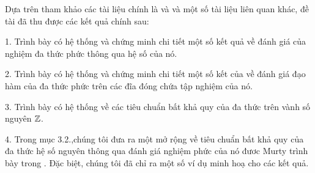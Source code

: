 \documentclass[a5paper,12pt]{report}
\theoremstyle{definition}
\numberwithin{equation}{chapter}
\begin{document}
	Dựa trên tham khảo các tài liệu chính là \cite{B} và \cite{R} và một số tài liệu liên quan khác, đề tài đã thu được các kết quả chính sau:
	\par 1. Trình bày có hệ thống và chứng minh chi tiết  một số kết quả về đánh giá của nghiệm đa thức phức thông qua hệ số của nó.
	\par 2. Trình bày có hệ thống và chứng minh chi tiết một số kết của về đánh giá đạo hàm của đa thức phức trên các đĩa đóng chứa tập nghiệm của nó. 
	\par 3. Trình bày có hệ thống về các tiêu chuẩn bất khả quy của đa thức trên vành số nguyên $\Bbb Z$.
	\par 4. Trong mục 3.2.,chúng  tôi đưa ra một mở rộng về  tiêu chuẩn bất khả quy của đa thức hệ số nguyên thông qua đánh giá nghiệm phức của nó đươc Murty trình bày trong \cite{R}. Đặc biệt, chúng tôi đã  chỉ ra một số ví dụ minh hoạ cho các kết quả. 
	
	
	
\end{document}
